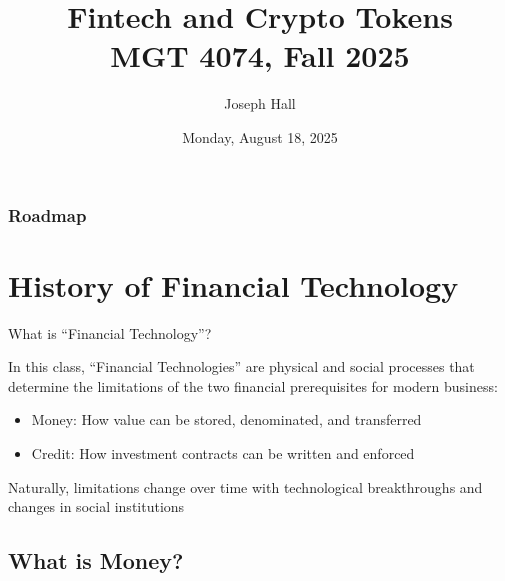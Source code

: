\documentclass[aspectratio=169]{beamer}
\title[Fintech and Crypto Tokens]{\huge{Fintech and Crypto Tokens} \\
\vspace{6mm}
\small{MGT 4074, Fall 2025}
} %
\author[Joseph Hall]{Joseph Hall} %
\institute[GT]{Georgia Institute of Technology} %
\date{Monday, August 18, 2025}
\begin{document}
\begin{frame}
\titlepage %
\end{frame}



























\begin{frame}
\frametitle{Roadmap}
\tableofcontents
\end{frame}
\section{History of Financial Technology}

\begin{frame}{What is ``Financial Technology''?}

In this class, ``Financial Technologies'' are physical and social processes that determine the limitations of the two financial prerequisites for modern business: 

\begin{itemize}
    \item Money: How value can be stored, denominated, and transferred
    \item Credit: How investment contracts can be written and enforced
\end{itemize}

Naturally, limitations change over time with technological breakthroughs and changes in social institutions
    
\end{frame}



\subsection{What is Money?}
\end{document}
